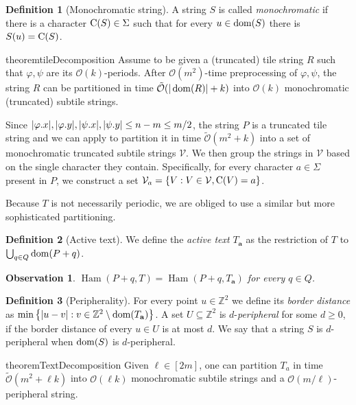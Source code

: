 \documentclass[11pt, letterpaper]{article}
\theoremstyle{plain}
\newtheorem{observation}{Observation}
\theoremstyle{definition}
\newtheorem{definition}{Definition}
\theoremstyle{remark}
\newcommand{\Z}{\mathbb{Z}}
\renewcommand{\O}{\mathcal{O}}
\newcommand{\tO}{\tilde{\mathcal{O}}}
\newcommand{\V}{\mathcal{V}}
\renewcommand{\phi}{\varphi}
\newcommand{\set}[1]{\left\lbrace #1 \right\rbrace}
\DeclareMathOperator*{\Ham}{Ham}
\begin{document}
\begin{definition}[Monochromatic string]
A string $S$ is called \emph{monochromatic} if there is a character $\operatorname*{C}(S) \in \Sigma$ such that for every $u \in \operatorname*{dom}(S)$ there is $S(u) = \operatorname*{C}(S)$.  
\end{definition}

\begin{restatable*}{theorem}{tileDecomposition}\label{tile_decomposition}
Assume to be given a (truncated) tile string $R$ such that $\phi, \psi$ are its $\O(k)$-periods. After $\O(m^2)$-time preprocessing of $\phi, \psi$, the string $R$ can be partitioned in time $\tO(|\d{R}| + k)$ into $\O(k)$ monochromatic (truncated) subtile strings.
\end{restatable*}

Since $|\x{\phi}|, |\y{\phi}|, |\x{\psi}|, |\y{\psi}| \le n - m \le m / 2$, the string $P$ is a truncated tile string and we can apply  to partition it in time $\tO(m^2 + k)$ into a set of monochromatic truncated subtile strings $\V$. We then group the strings in $\V$ based on the single character they contain. Specifically, for every character $a \in \Sigma$ present in $P$, we construct a set $\V_a = \set{V : V \in \V, \getchar{V} = a}$.

Because $T$ is not necessarily periodic, we are obliged to use a similar but more sophisticated partitioning.

\newcommand{\Ta}{T_\mathbf{a}}
\begin{definition}[Active text]
We define the \emph{active text} $\Ta$ as the restriction of $T$ to $\bigcup_{q \in Q} \operatorname*{dom}(P + q)$. 
\end{definition}

\begin{observation}\label{obs:active_text}
$\Ham(P + q, T) = \Ham(P + q, \Ta)$ for every $q \in Q$.
\end{observation}

\begin{definition}[Peripherality]
For every point $u \in \Z^2$ we define its \emph{border distance} as $\min\set{|u - v| : v \in \Z^2 \setminus \d{\Ta}}$. A set $U \subseteq \Z^2$ is $d$-\emph{peripheral} for some $d \ge 0$, if the border distance of every $u \in U$ is at most $d$. We say that a string $S$ is $d$-peripheral when $\operatorname*{dom}(S)$ is $d$-peripheral.
\end{definition}

\begin{restatable*}{theorem}{TextDecomposition}\label{text_decomposition}
Given $\ell \in [2m]$, one can partition $T_a$ in time $\tO(m^2 + \ell k)$ into $\O(\ell k)$ monochromatic subtile strings and a $\O(m / \ell)$-peripheral string.
\end{restatable*}
\end{document}
